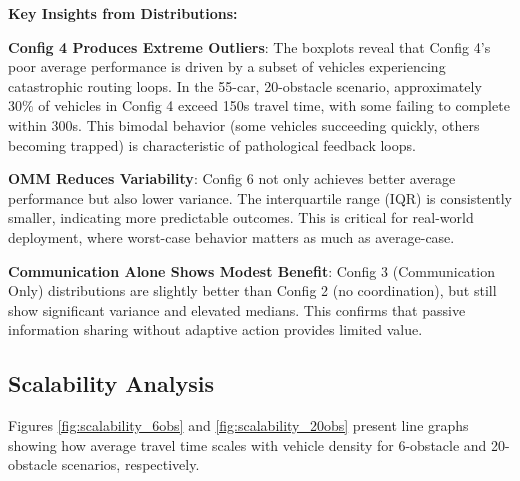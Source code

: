 \documentclass[conference]{IEEEtran}
\begin{document}
\textbf{Key Insights from Distributions:}

\textbf{Config 4 Produces Extreme Outliers}: The boxplots reveal that Config 4's poor average performance is driven by a subset of vehicles experiencing catastrophic routing loops. In the 55-car, 20-obstacle scenario, approximately 30\% of vehicles in Config 4 exceed 150s travel time, with some failing to complete within 300s. This bimodal behavior (some vehicles succeeding quickly, others becoming trapped) is characteristic of pathological feedback loops.

\textbf{OMM Reduces Variability}: Config 6 not only achieves better average performance but also lower variance. The interquartile range (IQR) is consistently smaller, indicating more predictable outcomes. This is critical for real-world deployment, where worst-case behavior matters as much as average-case.

\textbf{Communication Alone Shows Modest Benefit}: Config 3 (Communication Only) distributions are slightly better than Config 2 (no coordination), but still show significant variance and elevated medians. This confirms that passive information sharing without adaptive action provides limited value.

\subsection{Scalability Analysis}

Figures \ref{fig:scalability_6obs} and \ref{fig:scalability_20obs} present line graphs showing how average travel time scales with vehicle density for 6-obstacle and 20-obstacle scenarios, respectively.
\end{document}
